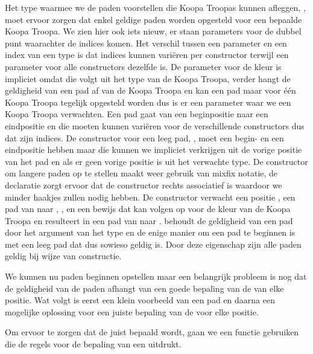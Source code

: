 Het type waarmee we de paden voorstellen die Koopa Troopas kunnen afleggen,
, moet ervoor zorgen dat enkel geldige paden worden opgesteld voor
een bepaalde Koopa Troopa. We zien hier ook iets nieuw, er staan parameters
voor de dubbel punt waarachter de indices komen. Het verschil tussen een
parameter en een index van een type is dat indices kunnen variëren per
constructor terwijl een parameter voor alle constructors dezelfde is. De
parameter voor de kleur is impliciet omdat die volgt uit het type van de Koopa
Troopa, verder hangt de geldigheid van een pad af van de Koopa Troopa en kan
een pad maar voor één Koopa Troopa tegelijk opgesteld worden dus is er een
parameter waar we een Koopa Troopa verwachten. Een pad gaat van een
beginpositie naar een eindpositie en die moeten kunnen variëren voor de
verschillende constructors dus dat zijn indices. De constructor voor een leeg
pad, \iagda{[]}, moet een begin- en een eindpositie hebben maar die kunnen we
impliciet verkrijgen uit de vorige positie van het pad en als er geen vorige
positie is uit het verwachte type. De constructor om langere paden op te
stellen maakt weer gebruik van mixfix notatie, de  declaratie
zorgt ervoor dat de constructor rechts associatief is waardoor we minder
haakjes zullen nodig hebben. De constructor verwacht een positie , een
pad van  naar , , en een bewijs dat  kan
volgen op  voor de kleur van de Koopa Troopa en resulteert in een pad
van  naar .  behoudt de geldigheid van een pad
door het argument van het type  en de enige manier om een
pad te beginnen is met een leeg pad dat dus sowieso geldig is. Door deze
eigenschap zijn alle paden geldig bij wijze van constructie.

We kunnen nu paden beginnen opstellen maar een belangrijk probleem is nog dat
de geldigheid van de paden afhangt van een goede bepaling van de
 van elke positie. Wat volgt is eerst een klein voorbeeld van
een pad en daarna een mogelijke oplossing voor een juiste bepaling van de
 voor elke positie.


Om ervoor te zorgen dat de  juist bepaald wordt, gaan we
een functie gebruiken die de regels voor de bepaling van een 
uitdrukt.


